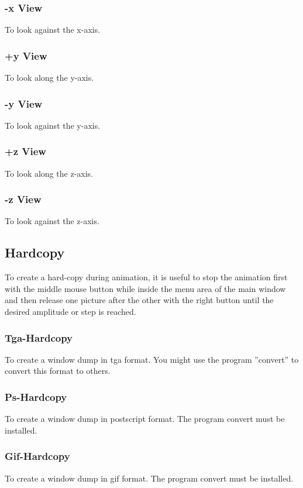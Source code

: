 \documentclass{article}
\begin{document}
\subsubsection{-x View}
To look against the x-axis.
\subsubsection{+y View}
To look along the y-axis.
\subsubsection{-y View}
To look against the y-axis.
\subsubsection{+z View}
To look along the z-axis.
\subsubsection{-z View}
To look against the z-axis.

\subsection{\label{Hardcopy}Hardcopy}
To create a hard-copy during animation, it is useful to stop the animation first with the middle mouse button while inside the menu area of the main window and then release one picture after the other with the right button until the desired amplitude or step is reached.
 
\subsubsection{\label{Tga-Hardcopy}Tga-Hardcopy}
To create a window dump in tga format. You might use the program ''convert'' \cite{ImageMagick} to convert this format to others.

\subsubsection{\label{Ps-Hardcopy}Ps-Hardcopy}
To create a window dump in postscript format. The program convert must be installed.

\subsubsection{\label{Gif-Hardcopy}Gif-Hardcopy}
To create a window dump in gif format. The program convert must be installed.
\end{document}
